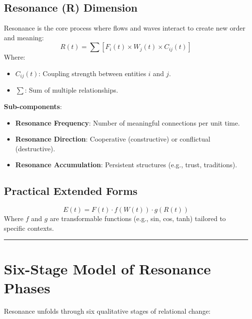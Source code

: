 \documentclass{article}
\begin{document}
\subsection{Resonance (R) Dimension}
Resonance is the core process where flows and waves interact to create new order and meaning:
$$
R(t) = \sum [F_i(t) \times W_j(t) \times C_{ij}(t)]
$$
Where:
\begin{itemize}
    \item $C_{ij}(t)$: Coupling strength between entities $i$ and $j$.
    \item $\sum$: Sum of multiple relationships.
\end{itemize}

\textbf{Sub-components}:
\begin{itemize}
    \item \textbf{Resonance Frequency}: Number of meaningful connections per unit time.
    \item \textbf{Resonance Direction}: Cooperative (constructive) or conflictual (destructive).
    \item \textbf{Resonance Accumulation}: Persistent structures (e.g., trust, traditions).
\end{itemize}

\subsection{Practical Extended Forms}
$$
E(t) = F(t) \cdot f(W(t)) \cdot g(R(t))
$$
Where $f$ and $g$ are transformable functions (e.g., sin, cos, tanh) tailored to specific contexts.

\hrule

\section{Six-Stage Model of Resonance Phases}
Resonance unfolds through six qualitative stages of relational change:
\end{document}
